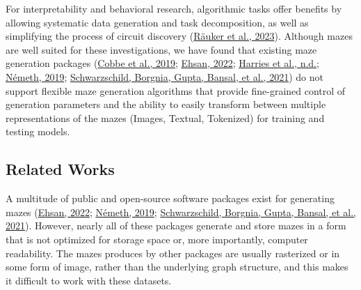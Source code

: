 \documentclass[10pt,a4paper,onecolumn]{article}
\begin{document}
For interpretability and behavioral research, algorithmic tasks offer
benefits by allowing systematic data generation and task decomposition,
as well as simplifying the process of circuit discovery
(\protect\hyperlink{ref-interpretability-survery}{Räuker et al., 2023}).
Although mazes are well suited for these investigations, we have found
that existing maze generation packages
(\protect\hyperlink{ref-cobbe2019procgen}{Cobbe et al., 2019};
\protect\hyperlink{ref-gh_Ehsan_2022}{Ehsan, 2022};
\protect\hyperlink{ref-harriesMazeExplorerCustomisable3D2019}{Harries et
al., n.d.}; \protect\hyperlink{ref-gh_Nemeth_2019}{Németh, 2019};
\protect\hyperlink{ref-easy_to_hard}{Schwarzschild, Borgnia, Gupta,
Bansal, et al., 2021}) do not support flexible maze generation
algorithms that provide fine-grained control of generation parameters
and the ability to easily transform between multiple representations of
the mazes (Images, Textual, Tokenized) for training and testing models.

\hypertarget{related-works}{%
\subsection{Related Works}\label{related-works}}

A multitude of public and open-source software packages exist for
generating mazes (\protect\hyperlink{ref-gh_Ehsan_2022}{Ehsan, 2022};
\protect\hyperlink{ref-gh_Nemeth_2019}{Németh, 2019};
\protect\hyperlink{ref-easy_to_hard}{Schwarzschild, Borgnia, Gupta,
Bansal, et al., 2021}). However, nearly all of these packages generate
and store mazes in a form that is not optimized for storage space or,
more importantly, computer readability. The mazes produces by other
packages are usually rasterized or in some form of image, rather than
the underlying graph structure, and this makes it difficult to work with
these datasets.
\end{document}
